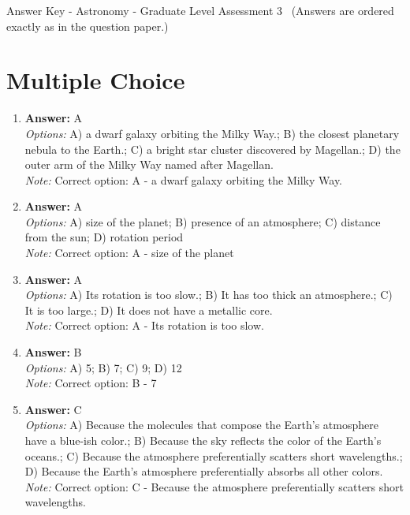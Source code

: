 \documentclass[12pt]{article}
\begin{document}
\begin{center}
Answer Key - Astronomy - Graduate Level Assessment 3 \
\small (Answers are ordered exactly as in the question paper.)
\end{center}

\section*{Multiple Choice}
\begin{enumerate}[label=\arabic*.]
\item \textbf{Answer:} A
\\ \textit{Options:} A) a dwarf galaxy orbiting the Milky Way.; B) the closest planetary nebula to the Earth.; C) a bright star cluster discovered by Magellan.; D) the outer arm of the Milky Way named after Magellan.
\\ \textit{Note:} Correct option: A - a dwarf galaxy orbiting the Milky Way.
\item \textbf{Answer:} A
\\ \textit{Options:} A) size of the planet; B) presence of an atmosphere; C) distance from the sun; D) rotation period
\\ \textit{Note:} Correct option: A - size of the planet
\item \textbf{Answer:} A
\\ \textit{Options:} A) Its rotation is too slow.; B) It has too thick an atmosphere.; C) It is too large.; D) It does not have a metallic core.
\\ \textit{Note:} Correct option: A - Its rotation is too slow.
\item \textbf{Answer:} B
\\ \textit{Options:} A) 5; B) 7; C) 9; D) 12
\\ \textit{Note:} Correct option: B - 7
\item \textbf{Answer:} C
\\ \textit{Options:} A) Because the molecules that compose the Earth's atmosphere have a blue-ish color.; B) Because the sky reflects the color of the Earth's oceans.; C) Because the atmosphere preferentially scatters short wavelengths.; D) Because the Earth's atmosphere preferentially absorbs all other colors.
\\ \textit{Note:} Correct option: C - Because the atmosphere preferentially scatters short wavelengths.
\end{enumerate}
\end{document}

